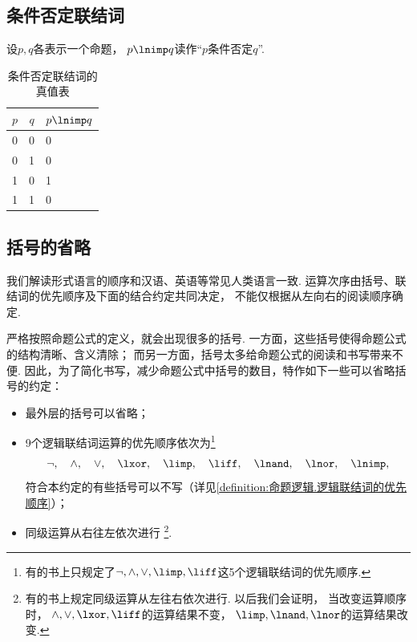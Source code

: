 \subsection{条件否定联结词}
设\(p,q\)各表示一个命题，
\(p \lnimp q\)读作“\(p\)条件否定\(q\)”.

\begin{table}[ht]
	\centering
	\begin{tabular}{|*{2}{c|}p{2cm}|}
		\hline
		\(p\) & \(q\) & \(p \lnimp q\) \\
		\hline
		0 & 0 & 0 \\
		0 & 1 & 0 \\
		1 & 0 & 1 \\
		1 & 1 & 0 \\
		\hline
	\end{tabular}
	\caption{条件否定联结词的真值表}
\end{table}

\subsection{括号的省略}
我们解读形式语言的顺序和汉语、英语等常见人类语言一致.
运算次序由括号、联结词的优先顺序及下面的结合约定共同决定，
不能仅根据从左向右的阅读顺序确定.

严格按照命题公式的定义，就会出现很多的括号.
一方面，这些括号使得命题公式的结构清晰、含义清除；
而另一方面，括号太多给命题公式的阅读和书写带来不便.
因此，为了简化书写，减少命题公式中括号的数目，特作如下一些可以省略括号的约定：\begin{itemize}
	\item 最外层的括号可以省略；
	\item 9个逻辑联结词运算的优先顺序依次为\footnote{
		有的书上只规定了\(\neg,\land,\lor,\limp,\liff\)这5个逻辑联结词的优先顺序.
	}\begin{equation*}
		\neg, \quad
		\land, \quad
		\lor, \quad
		\lxor, \quad
		\limp, \quad
		\liff, \quad
		\lnand, \quad
		\lnor, \quad
		\lnimp,
	\end{equation*}
	符合本约定的有些括号可以不写（详见\cref{definition:命题逻辑.逻辑联结词的优先顺序}）；
	\item 同级运算从右往左依次进行
	\footnote{
		有的书上规定同级运算从左往右依次进行.
		以后我们会证明，
		当改变运算顺序时，
		\(\land,\lor,\lxor,\liff\)的运算结果不变，
		\(\limp,\lnand,\lnor\)的运算结果改变.
	}.
\end{itemize}


